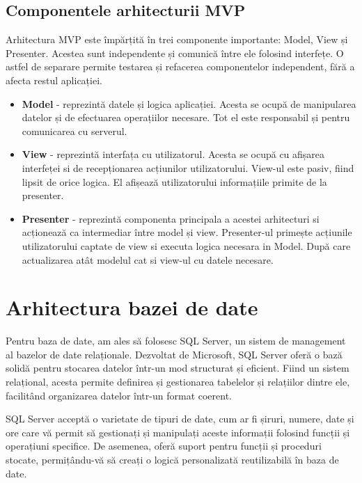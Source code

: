 \subsection{Componentele arhitecturii MVP}

Arhitectura MVP este împărțită în trei componente importante: Model, View și Presenter. Acestea sunt independente și comunică între ele folosind interfețe. O astfel de separare permite testarea și refacerea componentelor independent, fără a afecta restul aplicației.

\begin{itemize}
    \item \textbf{Model} - reprezintă datele și logica aplicației. Acesta se ocupă de manipularea datelor și de efectuarea operațiilor necesare. Tot el este responsabil și pentru comunicarea cu serverul.
    \item \textbf{View} - reprezintă interfața cu utilizatorul. Acesta se ocupă cu afișarea interfeței si de recepționarea acțiunilor utilizatorului. View-ul este pasiv, fiind lipsit de orice logica. El afișează utilizatorului informațiile primite de la presenter.
    \item \textbf{Presenter} - reprezintă componenta principala a acestei arhitecturi si acționează ca intermediar între model și view. Presenter-ul primește acțiunile utilizatorului captate de view si executa logica necesara in Model. După care actualizarea atât modelul cat si view-ul cu datele necesare.
\end{itemize}

\section{Arhitectura bazei de date}


Pentru baza de date, am ales să folosesc SQL Server, un sistem de management al bazelor de date relaționale. Dezvoltat de Microsoft, SQL Server oferă o bază solidă pentru stocarea datelor într-un mod structurat și eficient. Fiind un sistem relațional, acesta permite definirea și gestionarea tabelelor și relațiilor dintre ele, facilitând organizarea datelor într-un format coerent.

SQL Server acceptă o varietate de tipuri de date, cum ar fi șiruri, numere, date și ore care vă permit să gestionați și manipulați aceste informații folosind funcții și operațiuni specifice. De asemenea, oferă suport pentru funcții și proceduri stocate, permițându-vă să creați o logică personalizată reutilizabilă în baza de date.

